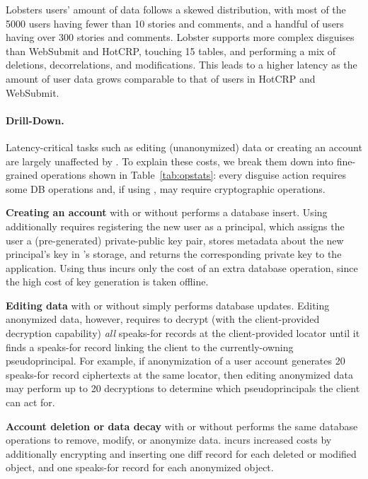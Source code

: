Lobsters users' amount of data follows a skewed distribution, with most of the 5000 users
having fewer than 10 stories and comments, and a handful of users having over 300 stories and
comments. Lobster supports more complex disguises than WebSubmit and HotCRP,
touching 15 tables, and performing a mix of deletions, decorrelations, and modifications. This leads
to a higher latency as the amount of user data grows comparable to that of users in HotCRP and
WebSubmit.


\paragraph{Drill-Down.}
%
Latency-critical tasks such as editing (unanonymized) data or
creating an account are largely unaffected by \sys.
%
To explain these costs, we break them down into fine-grained operations shown in
Table~\ref{tab:opstats}: every disguise action requires some DB operations and,
if using \sys, may require cryptographic operations.

\textbf{Creating an account} with or without \sys performs a database insert. Using \sys additionally
requires registering the new user as a principal, which assigns the user a (pre-generated)
private-public key pair, stores metadata about the new principal's key in \sys's storage, and
returns the corresponding private key to the application.
Using \sys thus incurs only the cost of an extra database operation, since the high cost of key
generation is taken offline.

\textbf{Editing data} with or without \sys simply performs database updates. Editing anonymized
data, however, requires \sys to decrypt (with the client-provided decryption capability) \emph{all}
speaks-for records at the client-provided locator until it finds a speaks-for record linking the
client to the currently-owning pseudoprincipal.  For example, if anonymization of a user account
generates 20 speaks-for record ciphertexts at the same locator, then editing anonymized data may
perform up to 20 decryptions to determine which pseudoprincipals the client can act for.

\textbf{Account deletion or data decay} with or without \sys performs the same database operations
to remove, modify, or anonymize data. \sys incurs increased costs by additionally encrypting and
inserting one diff record for each deleted or modified object, and one speaks-for record for each
anonymized object.

